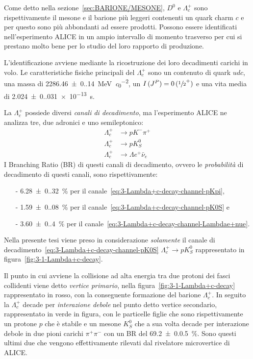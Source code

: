 Come detto nella sezione~\ref{sec:BARIONE/MESONE}, $D^{0}$ e $\Lambda_{c}^{+}$ sono rispettivamente il mesone e il barione più leggeri contenenti un quark charm $c$ e per questo sono più abbondanti ad essere prodotti. Possono essere identificati nell'esperimento ALICE in un ampio intervallo di momento trasverso per cui si prestano molto bene per lo studio del loro rapporto di produzione.

L’identificazione avviene mediante la ricostruzione dei loro decadimenti carichi in volo. Le caratteristiche fisiche principali del $\Lambda_{c}^{+}$ sono un contenuto di quark $udc$, una massa di \qty{2286.46(0.14)}{\mega \eV \per \clight^2}, un $I\,(J^P) = 0\,({\sfrac{1}{2}}^{+})$ e una vita media di \qty{2.024(0.031)e-13}{\second}.

La $\Lambda_{c}^{+}$ possiede diversi \textit{canali di decadimento}, ma l'esperimento ALICE ne analizza tre, due adronici e uno semileptonico:
\begin{align}
    \Lambda_{c}^{+} & \to p K^{-} \pi^{+} 
    \label{eq:3-Lambda+c-decay-channel-pKpi}\\
    \Lambda_{c}^{+} & \to p K^{0}_{S}
    \label{eq:3-Lambda+c-decay-channel-pK0S} \\
    \Lambda_{c}^{+} & \to \Lambda e^{+} \bar{\nu}_{e}
    \label{eq:3-Lambda+c-decay-channel-Lambdae+nue}
\end{align}
I Branching Ratio (BR) di questi canali di decadimento, ovvero le \textit{probabilità} di decadimento di questi canali, sono rispettivamente:
\begin{itemize}
    \item[-] \qty{6.28(0.32)}{\percent} per il canale~\ref{eq:3-Lambda+c-decay-channel-pKpi},

    \item[-] \qty{1.59(0.08)}{\percent} per il canale~\ref{eq:3-Lambda+c-decay-channel-pK0S} e

    \item[-] \qty{3.60(0.40)}{\percent} per il canale~\ref{eq:3-Lambda+c-decay-channel-Lambdae+nue}.
\end{itemize}
Nella presente tesi viene preso in considerazione \textit{solamente} il canale di decadimento~\ref{eq:3-Lambda+c-decay-channel-pK0S} $\Lambda_{c}^{+} \to p K^{0}_{S}$ rappresentato in
figura~\ref{fig:3-1-Lambda+c-decay}.

Il punto in cui avviene la collisione ad alta energia tra due protoni dei fasci collidenti viene detto \textit{vertice primario}, nella figura~\ref{fig:3-1-Lambda+c-decay} rappresentato in rosso, con la conseguente formazione del barione $\Lambda_{c}^{+}$. In seguito la $\Lambda_{c}^{+}$ decade per \textit{interazione debole} nel punto detto vertice secondario, rappresentato in verde in figura, con le particelle figlie che sono rispettivamente un protone $p$ che è stabile e un mesone $K^{0}_{S}$ che a sua volta decade per interazione debole in due pioni carichi $\pi^{+} \pi^{-}$ con un BR del \qty{69.2(0.05)}{\percent}. Sono questi ultimi due che vengono effettivamente rilevati dal rivelatore microvertice di ALICE.

